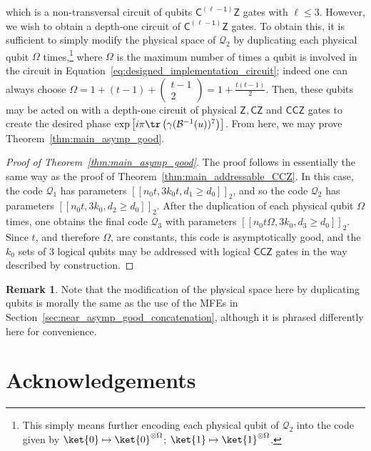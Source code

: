 \documentclass[11pt]{article}
\theoremstyle{definition}
\newtheorem{remark}[theorem]{Remark}
\renewcommand{\leq}{\leqslant}
\renewcommand{\geq}{\geqslant}
\newcommand{\CCZ}{\mathsf{CCZ}}
\newcommand{\CLZ}{\mathsf{C^{(\ell-1)}Z}}
\newcommand{\qcode}{\mathcal{Q}}
\begin{document}
which is a non-transversal circuit of qubits $\CLZ$ gates with $\ell \leq 3$. However, we wish to obtain a depth-one circuit of $\CLZ$ gates. To obtain this, it is sufficient to simply modify the physical space of $\qcode_2$ by duplicating each physical qubit $\Omega$ times,\footnote{This simply means further encoding each physical qubit of $\qcode_2$ into the code given by $\ket{0} \mapsto \ket{0}^{\otimes \Omega}$; $\ket{1} \mapsto \ket{1}^{\otimes \Omega}$.} where $\Omega$ is the maximum number of times a qubit is involved in the circuit in Equation~\eqref{eq:designed_implementation_circuit}; indeed one can always choose $\Omega = 1 + (t-1) + \begin{pmatrix}
    t-1 \\2
\end{pmatrix} = 1+\frac{t(t-1)}{2}$. Then, these qubits may be acted on with a depth-one circuit of physical $\mathsf{Z}, \mathsf{CZ}$ and $\CCZ$ gates to create the desired phase $\exp\left[i\pi\tr\left(\gamma(\mathcal{B}^{-1}(u))^7\right)\right]$. From here, we may prove Theorem~\ref{thm:main_asymp_good}.
\begin{proof}[Proof of Theorem~\ref{thm:main_asymp_good}]
    The proof follows in essentially the same way as the proof of Theorem~\ref{thm:main_addressable_CCZ}. In this case, the code $\qcode_1$ has parameters $[[n_0t,3k_0t,d_1 \geq d_0]]_2$, and so the code $\qcode_2$ has parameters $[[n_0t,3k_0,d_2 \geq d_0]]_2$. After the duplication of each physical qubit $\Omega$ times, one obtains the final code $\qcode_3$ with parameters $[[n_0t\Omega,3k_0,d_3 \geq d_0]]_2$. Since $t$, and therefore $\Omega$, are constants, this code is asymptotically good, and the $k_0$ sets of 3 logical qubits may be addressed with logical $\CCZ$ gates in the way described by construction.
\end{proof}
\begin{remark}
    Note that the modification of the physical space here by duplicating qubits is morally the same as the use of the MFEs in Section~\ref{sec:near_asymp_good_concatenation}, although it is phrased differently here for convenience.
\end{remark}













\section*{Acknowledgements}
\end{document}
